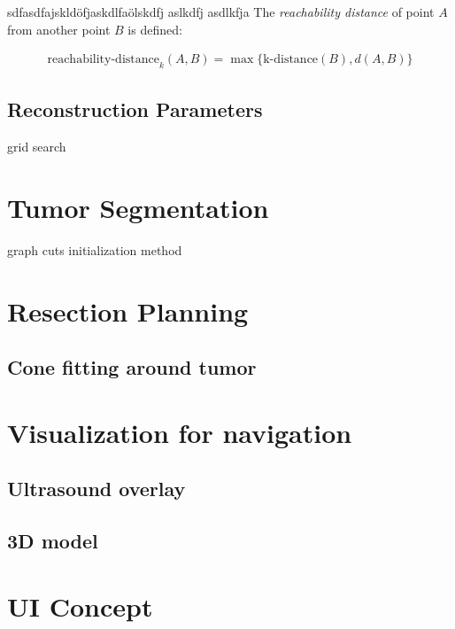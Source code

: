 sdfasdfajskldöfjaskdlfaölskdfj aslkdfj asdlkfja The \textit{reachability distance} of point $A$ from another point $B$ is defined:

\begin{gather*}
  \mbox{reachability-distance}_k(A,B)=\max\{\mbox{k-distance}(B), d(A,B)\}
\end{gather*}

\subsection{Reconstruction Parameters}
grid search
\section{Tumor Segmentation}
graph cuts
initialization method
\section{Resection Planning}
\subsection{Cone fitting around tumor}
\section{Visualization for navigation}
\subsection{Ultrasound overlay}
\subsection{3D model}
\section{UI Concept}
